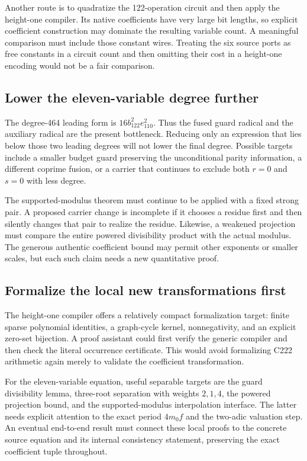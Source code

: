 Another route is to quadratize the 122-operation circuit and then apply
the height-one compiler. Its native coefficients have very large bit
lengths, so explicit coefficient construction may dominate the resulting
variable count. A meaningful comparison must include those constant
wires. Treating the six source ports as free constants in a circuit
count and then omitting their cost in a height-one encoding would not
be a fair comparison.

\subsection{Lower the eleven-variable degree further}

The degree-464 leading form is $16b_{122}^2e_{110}^2$. Thus the fused
guard radical and the auxiliary radical are the present bottleneck.
Reducing only an expression that lies below those two leading degrees
will not lower the final degree. Possible targets include a smaller
budget guard preserving the unconditional parity information, a
different coprime fusion, or a carrier that continues to exclude both
$r=0$ and $s=0$ with less degree.

The supported-modulus theorem must continue to be applied with a fixed
strong pair. A proposed carrier change is incomplete if it chooses a
residue first and then silently changes that pair to realize the residue.
Likewise, a weakened projection must compare the entire powered
divisibility product with the actual modulus. The generous authentic
coefficient bound may permit other exponents or smaller scales, but
each such claim needs a new quantitative proof.

\subsection{Formalize the local new transformations first}

The height-one compiler offers a relatively compact formalization
target: finite sparse polynomial identities, a graph-cycle kernel,
nonnegativity, and an explicit zero-set bijection. A proof assistant
could first verify the generic compiler and then check the literal
occurrence certificate. This would avoid formalizing C222 arithmetic
again merely to validate the coefficient transformation.

For the eleven-variable equation, useful separable targets are the
guard divisibility lemma, three-root separation with weights $2,1,4$,
the powered projection bound, and the supported-modulus interpolation
interface. The latter needs explicit attention to the exact period
$4m_0f$ and the two-adic valuation step. An eventual end-to-end result
must connect these local proofs to the concrete source equation and
its internal consistency statement, preserving the exact coefficient
tuple throughout.

